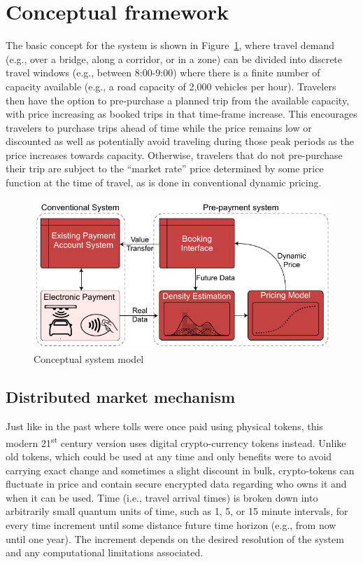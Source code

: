 \documentclass{article}
\begin{document}

\section{Conceptual framework}
The basic concept for the system is shown in Figure~\ref{fig:systemmodel}, where travel demand (e.g., over a bridge, along a corridor, or in a zone) can be divided into discrete travel windows (e.g., between 8:00-9:00) where there is a finite number of capacity available (e.g., a road capacity of 2,000 vehicles per hour). Travelers then have the option to pre-purchase a planned trip from the available capacity, with price increasing as booked trips in that time-frame increase. This encourages travelers to purchase trips ahead of time while the price remains low or discounted as well as potentially avoid traveling during those peak periods as the price increases towards capacity. Otherwise, travelers that do not pre-purchase their trip are subject to the ``market rate'' price determined by some price function at the time of travel, as is done in conventional dynamic pricing.

\begin{figure}[h]
	\includegraphics[width=\linewidth]{figures/systemmodel}
	\centering
	\caption{Conceptual system model}
	\label{fig:systemmodel}
\end{figure}

\subsection{Distributed market mechanism}
Just like in the past where tolls were once paid using physical tokens, this modern 21\textsuperscript{st} century version uses digital crypto-currency tokens instead. Unlike old tokens, which could be used at any time and only benefits were to avoid carrying exact change and sometimes a slight discount in bulk, crypto-tokens can fluctuate in price and contain secure encrypted data regarding who owns it and when it can be used. Time (i.e., travel arrival times) is broken down into arbitrarily small quantum units of time, such as 1, 5, or 15 minute intervals, for every time increment until some distance future time horizon (e.g., from now until one year). The increment depends on the desired resolution of the system and any computational limitations associated. 
\end{document}
